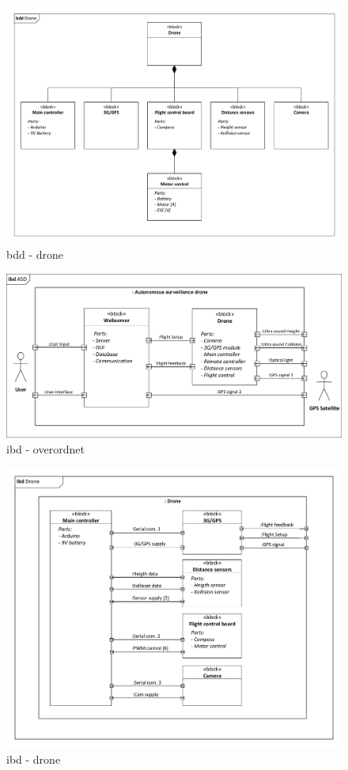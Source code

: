 \begin{figure}[H]
\centering
\includegraphics[width=1\textwidth]{Billeder/BDD/bdd_drone.pdf}
\caption{bdd - drone}
\label{fig:bdd_drone}
\end{figure}

\begin{figure}[H]
\centering
\includegraphics[width=1\textwidth]{Billeder/IBD/ibd1_overordnet.pdf}
\caption{ibd - overordnet}
\label{fig:ibd_overordnet}
\end{figure}

\begin{figure}[H]
\centering
\includegraphics[width=1\textwidth]{Billeder/IBD/ibd2_drone.pdf}
\caption{ibd - drone}
\label{fig:ibd_drone}
\end{figure}

